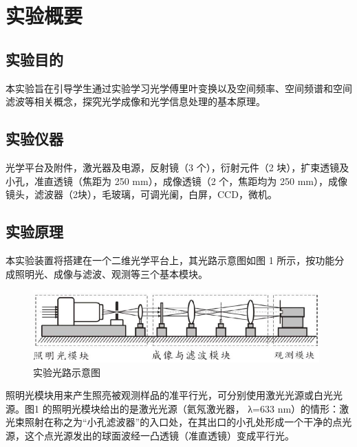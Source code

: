 \documentclass[a4paper]{article}
\begin{document}


\linespread{1.4} \selectfont
\section{实验概要}
\subsection{实验目的}
\hspace{2em}本实验旨在引导学生通过实验学习光学傅里叶变换以及空间频率、空间频谱和空间滤波等相关概念，探究光学成像和光学信息处理的基本原理。

%
\subsection{实验仪器}
\hspace{2em}光学平台及附件，激光器及电源，反射镜（3 个），衍射元件（2 块），扩束透镜及小孔，准直透镜（焦距为 250 mm），成像透镜（2 个，焦距均为 250 mm），成像镜头，滤波器（2块），毛玻璃，可调光阑，白屏，CCD，微机。

\subsection{实验原理}
\hspace{2em}本实验装置将搭建在一个二维光学平台上，其光路示意图如图 1 所示，按功能分成照明光、成像与滤波、观测等三个基本模块。\par

\begin{figure}[htbp]
    \centering
    \captionsetup{justification=centering,margin=2cm}
    \includegraphics[width=110mm]{fig1.png}
    \caption{实验光路示意图}
\end{figure}

\hspace{2em}照明光模块用来产生照亮被观测样品的准平行光，可分别使用激光光源或白光光源。图1 的照明光模块给出的是激光光源（氦氖激光器， λ=633 nm）的情形：激光束照射在称之为“小孔滤波器”的入口处，在其出口的小孔处形成一个干净的点光源，这个点光源发出的球面波经一凸透镜（准直透镜）变成平行光。\par
\end{document}

